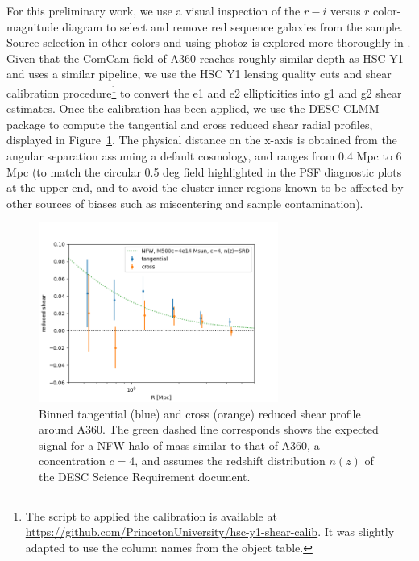 \documentclass[SE,lsstdraft,authoryear,toc]{lsstdoc}
\begin{document}
For this preliminary work, we use a visual inspection of the $r-i$ versus $r$ color-magnitude diagram to select and remove red sequence galaxies from the sample. Source selection in other colors and using photoz is explored more thoroughly in \citet{SITCOMTN-163}. 
Given that the ComCam field of A360 reaches roughly similar depth as HSC Y1 and uses a similar pipeline, we use the HSC Y1 lensing quality cuts and shear calibration procedure\footnote{The script to applied the calibration is available at \url{https://github.com/PrincetonUniversity/hsc-y1-shear-calib}. It was slightly adapted to use the column names from the object table.} \citep{2018MNRAS.481.3170M} to convert the e1 and e2 ellipticities into g1 and g2 shear estimates. Once the calibration has been applied, we use the DESC CLMM package \citep{2021MNRAS.508.6092A} to compute the tangential and cross reduced shear radial profiles, displayed in Figure~\ref{fig:shear_profile}. The physical distance on the x-axis is obtained from the angular separation assuming a default cosmology, and ranges from 0.4 Mpc to 6 Mpc (to match the circular 0.5 deg field highlighted in the PSF diagnostic plots at the upper end, and to avoid the cluster inner regions known to be affected by other sources of biases such as miscentering and sample contamination). 

\begin{figure}
\centering
\includegraphics[width=0.7\textwidth]{Figures/shear_profile.png}
\caption{Binned tangential (blue) and cross (orange) reduced shear profile around A360. The green dashed line corresponds shows the expected signal for a NFW halo of mass similar to that of A360, a concentration $c=4$, and assumes the redshift distribution $n(z)$ of the DESC Science Requirement document. \label{fig:shear_profile}}
\end{figure}
\end{document}

